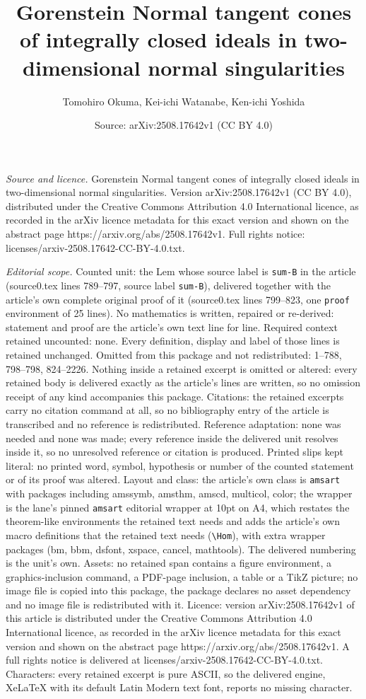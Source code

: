 \documentclass[10pt,a4paper]{amsart}
\title[Gorenstein Normal tangent cones of integrally closed ideals ]{Gorenstein Normal tangent cones of integrally closed ideals in two-dimensional normal singularities}
\author{Tomohiro Okuma, Kei-ichi Watanabe, Ken-ichi Yoshida}
\date{Source: arXiv:2508.17642v1 (CC BY 4.0)}
\begin{document}
\maketitle

\noindent\emph{Source and licence.} Gorenstein Normal tangent cones of integrally closed ideals in two-dimensional normal singularities. Version arXiv:2508.17642v1 (CC BY 4.0), distributed under the Creative Commons Attribution 4.0 International licence, as recorded in the arXiv licence metadata for this exact version and shown on the abstract page https://arxiv.org/abs/2508.17642v1. Full rights notice: licenses/arxiv-2508.17642-CC-BY-4.0.txt.\par\smallskip

\noindent\textit{Editorial scope.} Counted unit: the Lem whose source label is \texttt{sum-B} in the article (source0.tex lines 789--797, source label \texttt{sum-B}), delivered together with the article's own complete original proof of it (source0.tex lines 799--823, one \texttt{proof} environment of 25 lines). No mathematics is written, repaired or re-derived: statement and proof are the article's own text line for line. Required context retained uncounted: none. Every definition, display and label of those lines is retained unchanged. Omitted from this package and not redistributed: 1--788, 798--798, 824--2226. Nothing inside a retained excerpt is omitted or altered: every retained body is delivered exactly as the article's lines are written, so no omission receipt of any kind accompanies this package. Citations: the retained excerpts carry no citation command at all, so no bibliography entry of the article is transcribed and no reference is redistributed. Reference adaptation: none was needed and none was made; every reference inside the delivered unit resolves inside it, so no unresolved reference or citation is produced. Printed slips kept literal: no printed word, symbol, hypothesis or number of the counted statement or of its proof was altered. Layout and class: the article's own class is \texttt{amsart} with packages including amssymb, amsthm, amscd, multicol, color; the wrapper is the lane's pinned \texttt{amsart} editorial wrapper at 10pt on A4, which restates the theorem-like environments the retained text needs and adds the article's own macro definitions that the retained text needs (\texttt{\textbackslash Hom}), with extra wrapper packages (bm, bbm, dsfont, xspace, cancel, mathtools). The delivered numbering is the unit's own. Assets: no retained span contains a figure environment, a graphics-inclusion command, a PDF-page inclusion, a table or a TikZ picture; no image file is copied into this package, the package declares no asset dependency and no image file is redistributed with it. Licence: version arXiv:2508.17642v1 of this article is distributed under the Creative Commons Attribution 4.0 International licence, as recorded in the arXiv licence metadata for this exact version and shown on the abstract page https://arxiv.org/abs/2508.17642v1. A full rights notice is delivered at licenses/arxiv-2508.17642-CC-BY-4.0.txt. Characters: every retained excerpt is pure ASCII, so the delivered engine, XeLaTeX with its default Latin Modern text font, reports no missing character.
\end{document}
